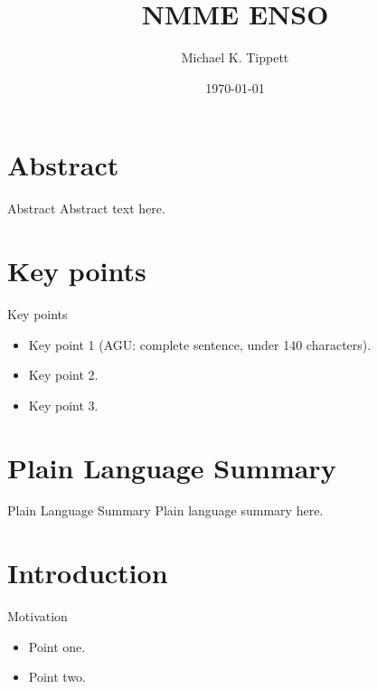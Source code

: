 \documentclass[aspectratio=169,xcolor=dvipsnames]{beamer}
\title[NMME ENSO]{NMME ENSO}
\author[Tippett]{Michael K. Tippett}
\institute{Columbia University}
\date{\today}
\begin{document}
\begin{frame}
  \titlepage
\end{frame}



\section*{Abstract}
\begin{frame}{Abstract}
  Abstract text here.
\end{frame}

\section*{Key points}
\begin{frame}{Key points}
  \begin{itemize}
    \item Key point 1 (AGU: complete sentence, under 140 characters).
    \item Key point 2.
    \item Key point 3.
  \end{itemize}
\end{frame}

\section*{Plain Language Summary}
\begin{frame}{Plain Language Summary}
  Plain language summary here.
\end{frame}

\section{Introduction}

\begin{frame}{Motivation}
  \begin{itemize}
    \item Point one.
    \item Point two.
  \end{itemize}
\end{frame}
\end{document}
